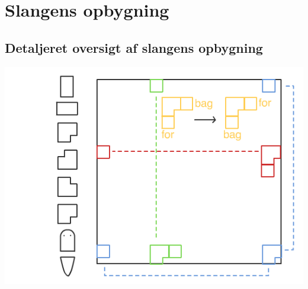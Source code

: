 \chapter{Slangens opbygning}
\section{Detaljeret oversigt af slangens opbygning}
\graphicspath{ {pics/} }
\includegraphics[width=1\textwidth]{SnakeGraphic.png}